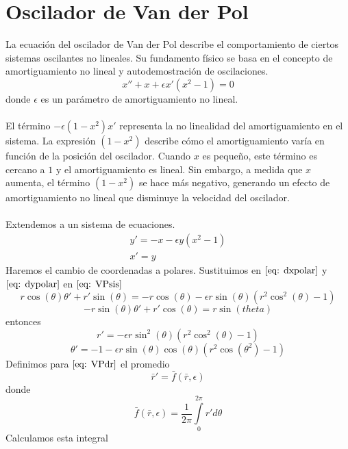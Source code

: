 \documentclass[12pt, a4paper]{report}
\begin{document}
\section{Oscilador de Van der Pol}
La ecuación del oscilador de Van der Pol describe el comportamiento de ciertos sistemas oscilantes no lineales.
Su fundamento físico se basa en el concepto de amortiguamiento no lineal y autodemostración de oscilaciones.
\begin{equation}\label{eq: VP}
	x''+x+\epsilon x'(x^2-1)=0
\end{equation}
donde $\epsilon$ es un parámetro de amortiguamiento no lineal.\\
\\El término $-\epsilon(1 - x^2)x'$ representa la no linealidad del amortiguamiento en el sistema. La expresión
$(1 - x^2)$ describe cómo el amortiguamiento varía en función de la posición del oscilador. Cuando $x$ es
pequeño, este término es cercano a $1$ y el amortiguamiento es lineal. Sin embargo, a medida que $x$
aumenta, el término $(1 - x^2)$ se hace más negativo, generando un efecto de amortiguamiento no lineal que
disminuye la velocidad del oscilador.\\
\\Extendemos a un sistema de ecuaciones.
\begin{equation}\label{eq: VPsis}
	\begin{matrix}
		y'=-x-\epsilon y(x^2-1) \\
		x'=y
	\end{matrix}
\end{equation}
Haremos el cambio de coordenadas a polares.
Sustituimos en $\eqref{eq: dxpolar}$ y $\eqref{eq: dypolar}$ en $\eqref{eq: VPsis}$
$$r\cos(\theta)\theta'+r'\sin(\theta)=-r\cos(\theta)-\epsilon r\sin(\theta)(r^2\cos^2(\theta)-1)$$
$$-r\sin(\theta)\theta'+r'\cos(\theta)=r\sin(theta)$$
entonces
\begin{equation}\label{eq: VPdr}
	r'=-\epsilon r\sin^2(\theta)(r^2\cos^2(\theta)-1)
\end{equation}
\begin{equation}\label{eq: VPdtheta}
	\theta'=-1-\epsilon r\sin(\theta)\cos(\theta)(r^2\cos(\theta^2)-1)
\end{equation}
Definimos para $\eqref{eq: VPdr}$ el promedio
\begin{equation}\label{eq: drbar}
	\bar{r}'=\bar{f}(\bar{r},\epsilon)
\end{equation}
donde
$$\bar{f}(\bar{r},\epsilon)=\frac{1}{2\pi}\int\limits_0^{2\pi}r'd\theta$$
Calculamos esta integral
\end{document}
